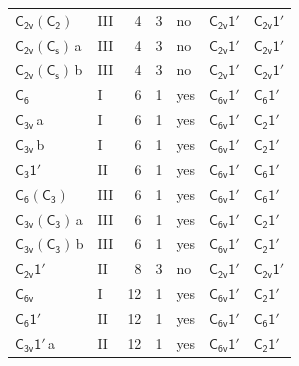 \documentclass[10pt,a4paper]{article}
\numberwithin{equation}{section}
\newcommand{\grp}[1]{\mathsf{#1}}
\newcommand{\clsletter}[1]{\,{\scriptsize\color{black!55}#1}}
\begin{document}
{\begin{longtable}{@{}llrrlll@{}}
\href{C2v-C2.pdf}{$\grp{C_{2v}}(\grp{C_{2}})$} & III & 4 & 3 & no & \href{C2v-1p.pdf}{$\grp{C_{2v}1'}$} & \href{C2v-1p.pdf}{$\grp{C_{2v}1'}$}\\
\href{C2v-C1v.pdf}{$\grp{C_{2v}}(\grp{C_{s}})$}\clsletter{a} & III & 4 & 3 & no & \href{C2v-1p.pdf}{$\grp{C_{2v}1'}$} & \href{C2v-1p.pdf}{$\grp{C_{2v}1'}$}\\
\href{C2v-C1v.pdf}{$\grp{C_{2v}}(\grp{C_{s}})$}\clsletter{b} & III & 4 & 3 & no & \href{C2v-1p.pdf}{$\grp{C_{2v}1'}$} & \href{C2v-1p.pdf}{$\grp{C_{2v}1'}$}\\
\href{../../../rotation/data/pdf/C6.pdf}{$\grp{C_{6}}$} & I & 6 & 1 & yes & \href{C6v-1p.pdf}{$\grp{C_{6v}1'}$} & \href{C6-1p.pdf}{$\grp{C_{6}1'}$}\\
\href{../../../rotation/data/pdf/C3v.pdf}{$\grp{C_{3v}}$}\clsletter{a} & I & 6 & 1 & yes & \href{C6v-1p.pdf}{$\grp{C_{6v}1'}$} & \href{C2-1p.pdf}{$\grp{C_{2}1'}$}\\
\href{../../../rotation/data/pdf/C3v.pdf}{$\grp{C_{3v}}$}\clsletter{b} & I & 6 & 1 & yes & \href{C6v-1p.pdf}{$\grp{C_{6v}1'}$} & \href{C2-1p.pdf}{$\grp{C_{2}1'}$}\\
\href{C3-1p.pdf}{$\grp{C_{3}1'}$} & II & 6 & 1 & yes & \href{C6v-1p.pdf}{$\grp{C_{6v}1'}$} & \href{C6-1p.pdf}{$\grp{C_{6}1'}$}\\
\href{C6-C3.pdf}{$\grp{C_{6}}(\grp{C_{3}})$} & III & 6 & 1 & yes & \href{C6v-1p.pdf}{$\grp{C_{6v}1'}$} & \href{C6-1p.pdf}{$\grp{C_{6}1'}$}\\
\href{C3v-C3.pdf}{$\grp{C_{3v}}(\grp{C_{3}})$}\clsletter{a} & III & 6 & 1 & yes & \href{C6v-1p.pdf}{$\grp{C_{6v}1'}$} & \href{C2-1p.pdf}{$\grp{C_{2}1'}$}\\
\href{C3v-C3.pdf}{$\grp{C_{3v}}(\grp{C_{3}})$}\clsletter{b} & III & 6 & 1 & yes & \href{C6v-1p.pdf}{$\grp{C_{6v}1'}$} & \href{C2-1p.pdf}{$\grp{C_{2}1'}$}\\
\href{C2v-1p.pdf}{$\grp{C_{2v}1'}$} & II & 8 & 3 & no & \href{C2v-1p.pdf}{$\grp{C_{2v}1'}$} & \href{C2v-1p.pdf}{$\grp{C_{2v}1'}$}\\
\href{../../../rotation/data/pdf/C6v.pdf}{$\grp{C_{6v}}$} & I & 12 & 1 & yes & \href{C6v-1p.pdf}{$\grp{C_{6v}1'}$} & \href{C2-1p.pdf}{$\grp{C_{2}1'}$}\\
\href{C6-1p.pdf}{$\grp{C_{6}1'}$} & II & 12 & 1 & yes & \href{C6v-1p.pdf}{$\grp{C_{6v}1'}$} & \href{C6-1p.pdf}{$\grp{C_{6}1'}$}\\
\href{C3v-1p.pdf}{$\grp{C_{3v}1'}$}\clsletter{a} & II & 12 & 1 & yes & \href{C6v-1p.pdf}{$\grp{C_{6v}1'}$} & \href{C2-1p.pdf}{$\grp{C_{2}1'}$}\\

\end{longtable}}
\end{document}
